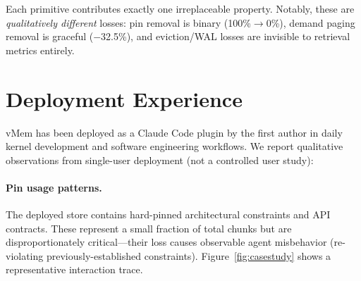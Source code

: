 \documentclass[10pt,twocolumn]{article}
\begin{document}
Each primitive contributes exactly one irreplaceable property. Notably, these are \emph{qualitatively different} losses: pin removal is binary (100\%$\to$0\%), demand paging removal is graceful ($-$32.5\%), and eviction/WAL losses are invisible to retrieval metrics entirely.

\section{Deployment Experience}
\label{sec:deployment}

vMem has been deployed as a Claude Code plugin by the first author in daily kernel development and software engineering workflows. We report qualitative observations from single-user deployment (not a controlled user study):

\paragraph{Pin usage patterns.} The deployed store contains hard-pinned architectural constraints and API contracts. These represent a small fraction of total chunks but are disproportionately critical---their loss causes observable agent misbehavior (re-violating previously-established constraints). Figure~\ref{fig:casestudy} shows a representative interaction trace.
\end{document}
